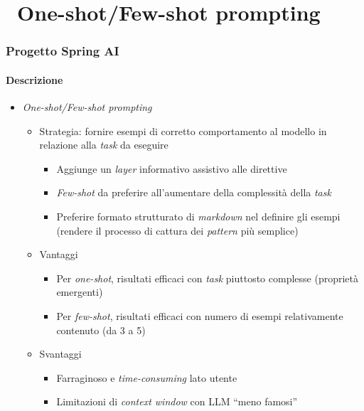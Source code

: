 \section{\faWrench\ One-shot/Few-shot prompting} %
\label{sec:spring-ai-gemini-few-shot-prompting}
%
\begin{frame}[t,fragile] \frametitle{Progetto Spring AI}
    \framesubtitle{Descrizione}
    {\small
        \begin{itemize}[leftmargin=10pt,align=right]
            \item[\alertedcircled{1}] \textit{One-shot/Few-shot prompting}
            \begin{itemize}[leftmargin=10pt,align=right]
                \item[\alert{\faArrowCircleRight}] Strategia: fornire esempi di corretto comportamento al modello in relazione alla \textit{task} da eseguire
                \begin{itemize}[leftmargin=10pt,align=right]
                    \item[\alert{\faArrowCircleRight}] Aggiunge un \textit{layer} informativo assistivo alle direttive
                    \item[\alert{\faExclamationTriangle}] \textit{Few-shot} da preferire all'aumentare della complessità della \textit{task}
                    \item[\alert{\faExclamationTriangle}] Preferire formato strutturato di \textit{markdown} nel definire gli esempi (rendere il processo di \alert{cattura dei \textit{pattern}} più semplice)
                \end{itemize}
                \item[\alert{\faArrowCircleRight}] Vantaggi
                \begin{itemize}[leftmargin=10pt,align=right]
                    \item[\alert{\faArrowCircleRight}] \alert{Per \textit{one-shot}}, risultati efficaci con \textit{task} piuttosto complesse (proprietà emergenti)
                    \item[\alert{\faArrowCircleRight}] \alert{Per \textit{few-shot}}, risultati efficaci con numero di esempi relativamente contenuto (da 3 a 5)
                \end{itemize}
                \item[\alert{\faArrowCircleRight}] Svantaggi
                \begin{itemize}[leftmargin=10pt,align=right]
                    \item[\alert{\faArrowCircleRight}] Farraginoso e \textit{time-consuming} lato utente
                    \item[\alert{\faArrowCircleRight}] Limitazioni di \textit{context window} con LLM ``meno famosi''
                \end{itemize}               
            \end{itemize}
        \end{itemize}
    }
\end{frame}
